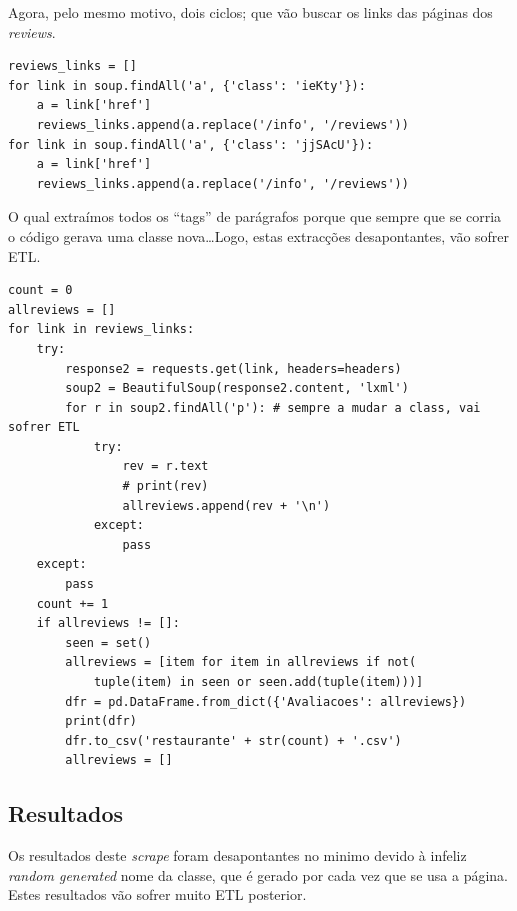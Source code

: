 \documentclass[a4paper,10pt]{article}
\begin{document}
\newpage

Agora, pelo mesmo motivo, dois ciclos; que vão buscar os links das páginas dos \textit{reviews}.

\begin{verbatim}
reviews_links = []
for link in soup.findAll('a', {'class': 'ieKty'}):
    a = link['href']
    reviews_links.append(a.replace('/info', '/reviews'))
for link in soup.findAll('a', {'class': 'jjSAcU'}):
    a = link['href']
    reviews_links.append(a.replace('/info', '/reviews'))
\end{verbatim}

O qual extraímos todos os ``tags'' de parágrafos porque que sempre que se corria o código gerava uma classe nova\ldots Logo, estas extracções desapontantes, vão sofrer ETL.

\begin{verbatim}
count = 0
allreviews = []
for link in reviews_links:
    try:
        response2 = requests.get(link, headers=headers)
        soup2 = BeautifulSoup(response2.content, 'lxml')
        for r in soup2.findAll('p'): # sempre a mudar a class, vai sofrer ETL
            try:
                rev = r.text
                # print(rev)
                allreviews.append(rev + '\n')
            except:
                pass
    except:
        pass
    count += 1
    if allreviews != []:
        seen = set()
        allreviews = [item for item in allreviews if not(
            tuple(item) in seen or seen.add(tuple(item)))]
        dfr = pd.DataFrame.from_dict({'Avaliacoes': allreviews})
        print(dfr)
        dfr.to_csv('restaurante' + str(count) + '.csv')
        allreviews = []
\end{verbatim}

\subsection{Resultados}

Os resultados deste \textit{scrape} foram desapontantes no minimo devido à infeliz \textit{random generated} nome da classe, que é gerado por cada vez que se usa a página. Estes resultados vão sofrer muito ETL posterior.
\end{document}
